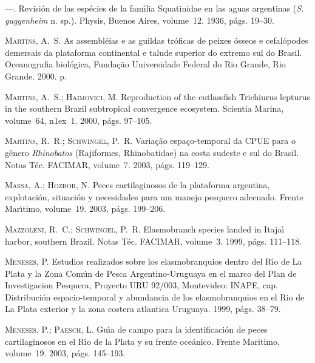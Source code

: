 \documentclass[a4paper,11pt,twoside,showtrims,onecolumn,openright,final]{memoir}
\begin{document}
\begin{thebibliography}{194}
---.
\newblock Revisi\'on de las esp\'ecies de la fam\'{\i}lia {S}quatinidae en las
  aguas argentinas (\emph{{S}. guggenheim} n. sp.).
\newblock Physis, Buenos Aires, volume~12. 1936, p\'ags. 19--30.

\textsc{Martins, A.~S.}
\newblock As assembl\'eias e as guildas tr\'oficas de peixes \'osseos e
  cefal\'opodes demersais da plataforma continental e talude superior do
  extremo sul do {B}rasil.
\newblock Oceanografia biol\'ogica, Funda\c{c}\~ao Universidade Federal do Rio
  Grande, Rio Grande. 2000.
 p.

\textsc{Martins, A.~S.; Haimovici, M.}
\newblock Reproduction of the cutlassfish {T}richiurus lepturus in the southern
  {B}razil subtropical convergence ecosystem.
\newblock Scientia Marina, volume~64, n\raise1ex\hbox{}~1. 2000, p\'ags. 97--105.

\textsc{Martins, R.~R.; Schwingel, P.~R.}
\newblock Varia\c{c}\~ao espa\c{c}o-temporal da {CPUE} para o g\^enero
  \emph{{R}hinobatos} ({R}ajiformes, {R}hinobatidae) na costa sudeste e sul do
  {B}rasil.
\newblock Notas T\'ec. FACIMAR, volume~7. 2003, p\'ags. 119--129.

\textsc{Massa, A.; Hozbor, N.}
\newblock Peces cartilaginosos de la plataforma argentina, explotaci\'on,
  situaci\'on y necesidades para um manejo pesquero adecuado.
\newblock Frente Mar\'{\i}timo, volume~19. 2003, p\'ags. 199--206.

\textsc{Mazzoleni, R.~C.; Schwingel, P.~R.}
\newblock Elasmobranch species landed in {I}taja\'{\i} harbor, southern
  {B}razil.
\newblock Notas T\'ec. FACIMAR, volume~3. 1999, p\'ags. 111--118.

\textsc{Meneses, P.}
\newblock Estudios realizados sobre los elasmobranquios dentro del {R}\'{\i}o
  de {L}a {P}lata y la {Z}ona {C}om\'un de {P}esca {A}rgentino-{U}ruguaya en el
  marco del {P}lan de {I}nvestigacion {P}esquera, Proyecto URU 92/003,
  Montevideo: INAPE, cap. Distribuci\'on espacio-temporal y abundancia de los
  elasmobranquios en el Rio de La Plata exterior y la zona costera atlantica
  Uruguaya. 1999, p\'ags. 38--79.

\textsc{Meneses, P.; Paesch, L.}
\newblock Gu\'{\i}a de campo para la identificaci\'on de peces cartilaginosos
  en el {R}\'{\i}o de la {P}lata y su frente oce\'anico.
\newblock Frente Maritimo, volume~19. 2003, p\'ags. 145--193.


\end{thebibliography}
\end{document}

